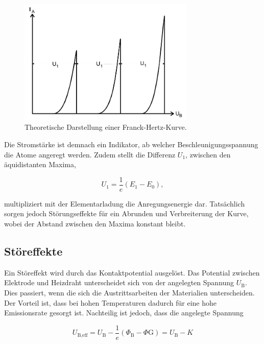 \begin{figure}[H]
  \centering
  \includegraphics[height=6cm]{ressources/kurve1.png}
  \caption{Theoretische Darstellung einer Franck-Hertz-Kurve. \cite{sample}}
  \label{fig:2}
\end{figure}

Die Stromstärke ist demnach ein Indikator, ab welcher Beschleunigungsspannung die Atome angeregt werden.
Zudem stellt die Differenz $U_1$, zwischen den äquidistanten Maxima,

\begin{equation}
  U_1 = \frac{1}{e}(E_1-E_0), \label{eqn:5}
\end{equation}

multipliziert mit der Elementarladung die Anregungsenergie dar.
Tatsächlich sorgen jedoch Störungseffekte für ein Abrunden und Verbreiterung der Kurve, wobei der Abstand zwischen den Maxima konstant bleibt.

\subsection{Störeffekte}

Ein Störeffekt wird durch das Kontaktpotential ausgelöst.
Das Potential zwischen Elektrode und Heizdraht unterscheidet sich von der angelegten Spannung $U_{\text{B}}$.
Dies passiert, wenn die sich die Austrittsarbeiten der Materialien unterscheiden.
Der Vorteil ist, dass bei hohen Temperaturen dadurch für eine hohe Emissionsrate gesorgt ist.
Nachteilig ist jedoch, dass die angelegte Spannung

\begin{equation}
  U_{\text{B,eff}} = U_{\text{B}} - \frac{1}{e}(\Phi_{\text{B}} - \Phi{\text{G}}) = U_{\text{B}} - K \label{eqn:6}
\end{equation}

